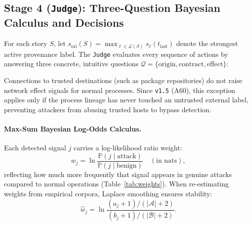 \documentclass[10pt,twocolumn,letterpaper]{article}
\makeatletter
\theoremstyle{plain}
\theoremstyle{definition}
\theoremstyle{remark}
\DeclareRobustCommand{\_}{\ifmmode\nfss@text{\textunderscore}\else\textunderscore\penalty\@highpenalty\hskip\z@skip\fi}
\makeatother
\begin{document}
\subsection{Stage 4 (\texttt{Judge}): Three-Question Bayesian Calculus and Decisions}
\label{sec:judge}


For each story $S$, let $s_{\text{ori}}(S) = \max_{\ell \in \mathcal{L}(S)} s_\ell(t_{\text{last}})$ denote the strongest active provenance label. The \texttt{Judge} evaluates every sequence of actions by answering three concrete, intuitive questions $\mathcal{Q} = \{\text{origin}, \text{contract}, \text{effect}\}$:
Connections to trusted destinations (such as package repositories) do not raise network effect signals for normal processes. Since \texttt{v1.5} (A60), this exception applies only if the process lineage has never touched an untrusted external label, preventing attackers from abusing trusted hosts to bypass detection.

\paragraph{Max-Sum Bayesian Log-Odds Calculus.} Each detected signal $j$ carries a log-likelihood ratio weight:
\begin{equation}
  w_j = \ln \frac{\mathbb{P}(j \mid \text{attack})}{\mathbb{P}(j \mid \text{benign})} \quad (\text{in nats}),
  \label{eq:llr_weight}
\end{equation}
reflecting how much more frequently that signal appears in genuine attacks compared to normal operations (Table~\ref{tab:weights}). When re-estimating weights from empirical corpora, Laplace smoothing ensures stability:
\begin{equation}
  \hat{w}_j = \ln \frac{(a_j + 1)/(|\mathcal{A}| + 2)}{(b_j + 1)/(|\mathcal{B}| + 2)}.
  \label{eq:reestimate}
\end{equation}
\end{document}
